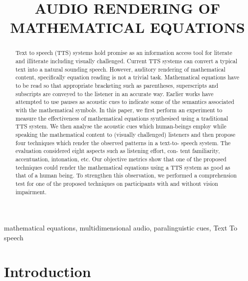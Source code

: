 \documentclass{article}
\title{AUDIO RENDERING OF MATHEMATICAL EQUATIONS}%
\begin{document}
%
\maketitle
%
\begin{abstract}
Text to speech (TTS) systems hold promise as an information access tool for literate and illiterate including visually challenged. Current TTS systems can convert a typical text into a natural sounding speech. However, auditory rendering of mathematical content, specifically equation reading is not a trivial task. Mathematical equations have to be read so that appropriate bracketing such as parentheses, superscripts and subscripts are conveyed to the listener in an accurate way. Earlier works have attempted to use pauses as acoustic cues to indicate some of the semantics associated with the mathematical symbols. In this paper, we first perform an experiment to measure the effectiveness of mathematical equations synthesised using a traditional TTS system. We then analyse the acoustic cues which human-beings employ while speaking the mathematical content to (visually challenged) listeners and then propose four techniques which render the observed patterns in a text-to- speech system. The evaluation considered eight aspects such as listening effort, con- tent familiarity, accentuation, intonation, etc.  Our objective metrics show that  one of the proposed techniques could render the mathematical equations using a TTS system as good as that of a human being. To strengthen this observation, we performed a comprehension test for one of the proposed techniques on participants with and without vision impairment.
\end{abstract}
%
\begin{keywords}
mathematical equations, multidimensional audio, paralinguistic cues, Text To speech
\end{keywords}
%
\section{Introduction}
\label{sec:intro}
\end{document}
